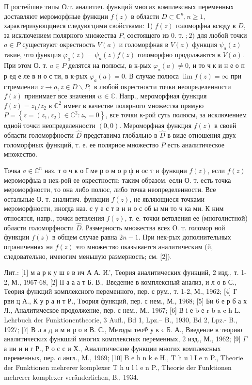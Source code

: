 \documentclass[10pt]{article}
\begin{document}
П ростейшие типы О.т. аналитич. функций многих комплексных переменных доставляют мероморфные функции $f(z)$ в области $D \subset \mathbb{C}^{n}, n \geqslant 1$, характеризующциеся следуюгцими свойствами: 1) $f(z)$ голоморфна всюду в $D$, за исключением полярного множества $P$, состоящего из 0. т. $; 2)$ для любой точки $a \in P$ существуют окрестность $V(a)$ и голоморфная в $V(a)$ функция $\psi_{a}(z)$ такие, что функция $\varphi_{a}(z)=\psi_{a}(z) f(z)$ голоморфно продолжавтся в $V(a)$. При этом О. т. $a \in P$ делятся на полюсы, в к-рых $\varphi_{a}(a) \neq 0$, и то ч к и н е о п р ед е ле в н о с ти, в к-рых $\varphi_{a}(a)=0$. В случае полюса $\lim f(z)=\infty$ при стремлении $z \rightarrow a, z \in D \backslash P ;$ в любой окрестности точки неопределенности $f(z)$ принимает все значения $w \in \mathbb{C}$. Напр., мероморфная функция $f(z)=z_{1} / z_{2}$ в $\mathbb{C}^{2}$ имеет в качестве полярного множества прямую $P=\left\{z=\left(z_{1}, z_{2}\right) \in \mathbb{C}^{2}: z_{2}=0\right\}$, все точки к-рой суть полюсы, за исключением одной точки неопределенности $(0,0)$. Мероморфная функция $f(z)$ в своей области голоморфности $\hat{D}$ представима глобально в $\hat{D}$ в виде отношения двух голоморфных функций, т. е. ее полярное множество $P$ есть аналитическое множество.

Точка $a \in \mathbb{C}^{n}$ наз. т о ч к о І̆ ме р о м о р ф н ос т и функции $f(z)$, если $f(z)$ мероморфыа в нек-рой ее окрестностн; таким образом, если О. т. есть точка мероморфности, то она либо полюс, либо точка неопределенности. Все остальные О. т. аналитич. функции $f(z)$, не являющиеся точками мероморфности, иногда наз. с у е с т в н н о с об ы ми то ч ка ми. К ним относятся, напр., точки ветвления $f(z)$, т. е. точки ветвления ее (многолистной) области голоморфности $\hat{D}$. Размерность множества всех О. т. голомор ной функции $f(z)$ в общем случае равна $2 n-1$. При нек-рых дополнительных ограничениях на $f(z)$ это множество оказывается аналитическим (й, следовательно, имеюгим меньшую размерность; см. [2]).

Лит.: [1] м а р к у ш е в ич А А. И.', Теория аналитических функций, 2 изд., т. 1-2, М., 1967-68, [2] ІІ а а а т Б. В., Введение в комплексный анализ, и л о в С., Теория функций комплексного переменного, пер. с
рум., т. 1-2, М., 1962; [4] Г рви ц А., К у р а н т Р., Төория функций, пер. с нем., М., 1968; [5] Би 6 е р б а х Л., Аналитическое продолжение, пер. с нем., М., 1967; [6] В і е b е r b a c h L. Lehrbuch der Funktionentheorie, 3 Aufl., Bd 1, Lpz.-- B., 1930, Bd 2, Lpz.- B., 1927; [7] В л а д и м и р о в В. С., Методы тео$\Phi$ у к с Б. А., Введение в теорию аналитических функший многих комплексных переменных, 2 изд., М., 1962; [9] $\Gamma$ а ин и н г Р., Р о с с и Х., Аналитические функции многих комплексных переменных, пер. c англ., M., 1969; [10] B e h n k e H.,
T h u l I e n P., Theorie der Funktionen mehrerer komplexer T h u l l e n P., Theorie der Funktionen mehrerer komplexer
veränderlichen, B., 1934.
\end{document}
